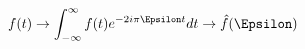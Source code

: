 \documentclass[preview]{standalone}
\begin{document}
\begin{align*}
f(t) \rightarrow \int_{-\infty}^{\infty}f(t)e^{-2 i \pi \Epsilon t} dt \rightarrow \hat{f}(\Epsilon)
\end{align*}
\end{document}
